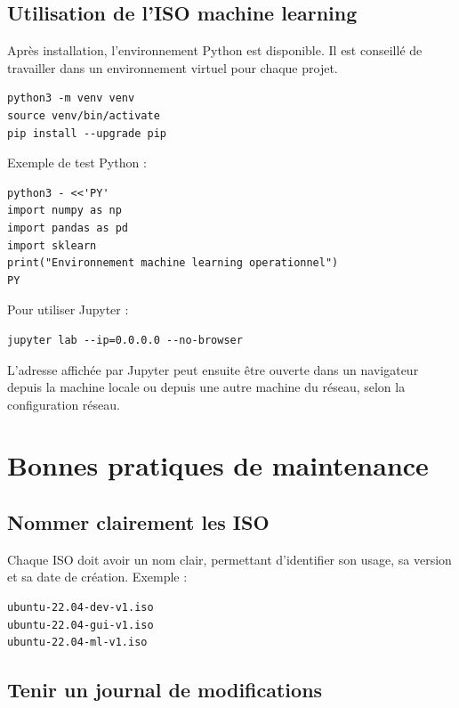 \documentclass[12pt,a4paper]{article}
\begin{document}
\subsection{Utilisation de l'ISO machine learning}

Après installation, l'environnement Python est disponible. Il est conseillé de travailler dans un environnement virtuel pour chaque projet.

\begin{lstlisting}
python3 -m venv venv
source venv/bin/activate
pip install --upgrade pip
\end{lstlisting}

Exemple de test Python :

\begin{lstlisting}
python3 - <<'PY'
import numpy as np
import pandas as pd
import sklearn
print("Environnement machine learning operationnel")
PY
\end{lstlisting}

Pour utiliser Jupyter :

\begin{lstlisting}
jupyter lab --ip=0.0.0.0 --no-browser
\end{lstlisting}

L'adresse affichée par Jupyter peut ensuite être ouverte dans un navigateur depuis la machine locale ou depuis une autre machine du réseau, selon la configuration réseau.

\section{Bonnes pratiques de maintenance}

\subsection{Nommer clairement les ISO}

Chaque ISO doit avoir un nom clair, permettant d'identifier son usage, sa version et sa date de création. Exemple :

\begin{lstlisting}
ubuntu-22.04-dev-v1.iso
ubuntu-22.04-gui-v1.iso
ubuntu-22.04-ml-v1.iso
\end{lstlisting}

\subsection{Tenir un journal de modifications}
\end{document}
